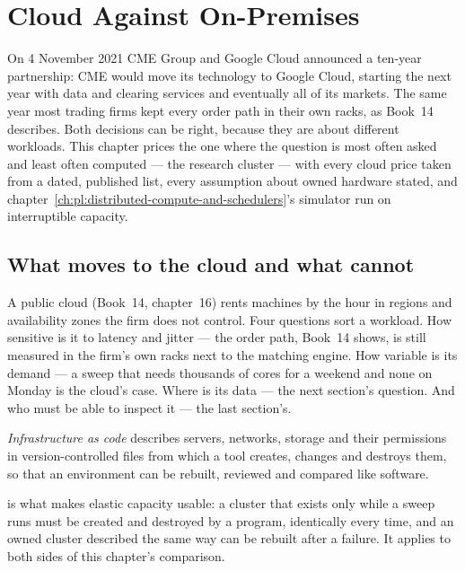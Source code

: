 \chapter{Cloud Against On-Premises}\label{ch:pl:cloud-against-on-premises}

On 4 November 2021 CME Group and Google Cloud announced a ten-year partnership: CME would move its technology to Google Cloud, starting the
next year with data and clearing services and eventually all of its markets. The same year most trading firms kept every order path in their
own racks, as Book~14 describes. Both decisions can be right, because they are about different workloads. This chapter prices the one where the
question is most often asked and least often computed --- the research cluster --- with every cloud price taken from a dated, published list,
every assumption about owned hardware stated, and chapter~\ref{ch:pl:distributed-compute-and-schedulers}'s simulator run on interruptible
capacity.

\section{What moves to the cloud and what cannot}

A public cloud (Book~14, chapter~16) rents machines by the hour in regions and availability zones the firm does not control. Four questions
sort a workload. How sensitive is it to latency and jitter --- the order path, Book~14 shows, is still measured in the firm's own racks next to
the matching engine. How variable is its demand --- a sweep that needs thousands of cores for a weekend and none on Monday is the cloud's
case. Where is its data --- the next section's question. And who must be able to inspect it --- the last section's.

\begin{definition}\label{def:pl:cloud-against-on-premises:iac}
\emph{Infrastructure as code} describes servers, networks, storage and their permissions in version-controlled
files from which a tool creates, changes and destroys them, so that an environment can be rebuilt, reviewed and compared like software.
\end{definition}

 is what makes elastic capacity usable: a cluster that exists only while a sweep runs must be created and destroyed by a
program, identically every time, and an owned cluster described the same way can be rebuilt after a failure. It applies to both sides of this
chapter's comparison.

